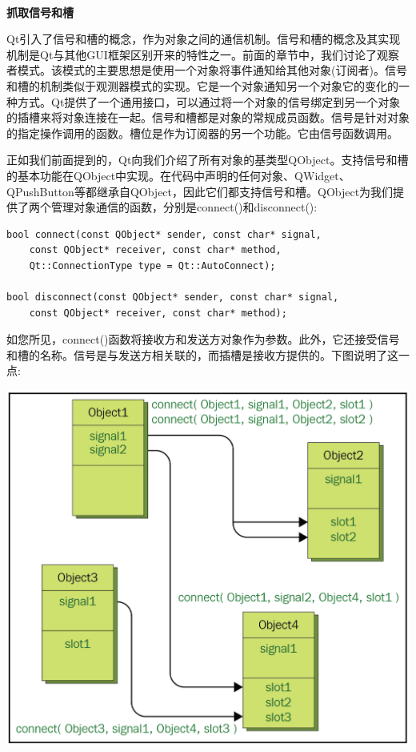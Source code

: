 \noindent\textbf{}\ \par
\textbf{抓取信号和槽} \ \par
Qt引入了信号和槽的概念，作为对象之间的通信机制。信号和槽的概念及其实现机制是Qt与其他GUI框架区别开来的特性之一。前面的章节中，我们讨论了观察者模式。该模式的主要思想是使用一个对象将事件通知给其他对象(订阅者)。信号和槽的机制类似于观测器模式的实现。它是一个对象通知另一个对象它的变化的一种方式。Qt提供了一个通用接口，可以通过将一个对象的信号绑定到另一个对象的插槽来将对象连接在一起。信号和槽都是对象的常规成员函数。信号是针对对象的指定操作调用的函数。槽位是作为订阅器的另一个功能。它由信号函数调用。 \par
正如我们前面提到的，Qt向我们介绍了所有对象的基类型QObject。支持信号和槽的基本功能在QObject中实现。在代码中声明的任何对象、QWidget、QPushButton等都继承自QObject，因此它们都支持信号和槽。QObject为我们提供了两个管理对象通信的函数，分别是connect()和disconnect(): \par

\begin{lstlisting}[caption={}]
bool connect(const QObject* sender, const char* signal,
	const QObject* receiver, const char* method,
	Qt::ConnectionType type = Qt::AutoConnect);

bool disconnect(const QObject* sender, const char* signal,
	const QObject* receiver, const char* method);
\end{lstlisting}

如您所见，connect()函数将接收方和发送方对象作为参数。此外，它还接受信号和槽的名称。信号是与发送方相关联的，而插槽是接收方提供的。下图说明了这一点:  \par

\begin{center}
	\includegraphics[width=1.0\textwidth]{content/Section-2/Chapter-14/8}
\end{center}

